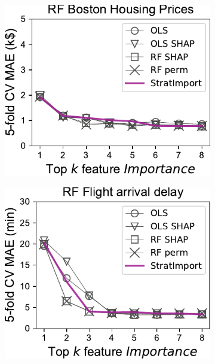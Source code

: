 \documentclass[11pt]{article}
\begin{document}
\begin{figure}
\centering
\begin{subfigure}{.245\textwidth}
    \centering
\includegraphics[scale=0.45]{images/boston-topk-RF-Importance.pdf}
\subcaption{}
\end{subfigure}%
\hfill
\begin{subfigure}{.245\textwidth}
    \centering
\includegraphics[scale=0.45]{images/flights-topk-RF-Importance.pdf}
\subcaption{}
\end{subfigure}
\hfill
\begin{subfigure}{.245\textwidth}
    \centering

\end{subfigure}
\end{figure}
\end{document}

